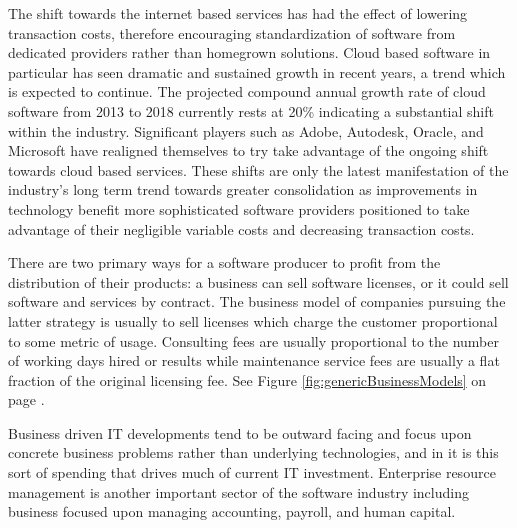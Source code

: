 The shift towards the internet based services has had the effect of lowering transaction costs, therefore encouraging standardization of software from dedicated providers rather than homegrown solutions.\autocite[46]{buxmann2012software}\autocite[]{SurveysSoftware2015}
Cloud based software in particular has seen dramatic and sustained growth in recent years, a trend which is expected to continue.
The projected compound annual growth rate of cloud software from 2013 to 2018 currently rests at 20\% indicating a substantial shift within the industry. Significant players such as Adobe, Autodesk, Oracle, and Microsoft have realigned themselves to try take advantage of the ongoing shift towards cloud based services.\autocite[40]{SurveysSoftware2015}
These shifts are only the latest manifestation of the industry's long term trend towards greater consolidation as improvements in technology benefit more sophisticated software providers positioned to take advantage of their negligible variable costs and decreasing transaction costs.\autocite[14]{buxmann2012software}

There are two primary ways for a software producer to profit from the distribution of their products: a business can sell software licenses, or it could sell software and services by contract.\autocite[]{ValuelineOverview}
The business model of companies pursuing the latter strategy is usually to sell licenses which charge the customer proportional to some metric of usage.\autocite[14]{buxmann2012software}
Consulting fees are usually proportional to the number of working days hired or results while maintenance service fees are usually a flat fraction of the original licensing fee.\autocite[16]{buxmann2012software} See Figure \ref{fig:genericBusinessModels} on page \pageref{fig:genericBusinessModels}.

Business driven IT developments tend to be outward facing and focus upon concrete business problems rather than underlying technologies, and in it is this sort of spending that drives much of current IT investment.\autocite[]{NextGenBusinessSoftware}
Enterprise resource management is another important sector of the software industry including business focused upon managing accounting, payroll, and human capital.\autocite[46]{SurveysSoftware2015}

